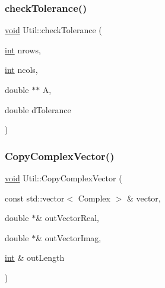 \mbox{\label{class_l_i_b___l_a_1_1_util_ab4e056ccf98d6691ccbb9fab23f0aa04}} 
\subsubsection{\texorpdfstring{check\+Tolerance()}{checkTolerance()}\hspace{0.1cm}{\footnotesize\ttfamily [2/2]}}
{\footnotesize\ttfamily \hyperlink{lp__lib_8h_ac7828c7b2b31d2e11af17bdb6289c5d9}{void} Util\+::check\+Tolerance (\begin{DoxyParamCaption}\item[{\hyperlink{lp__lib_8h_adeb9ec6400320e4923ac9d836d509ddb}{int}}]{nrows,  }\item[{\hyperlink{lp__lib_8h_adeb9ec6400320e4923ac9d836d509ddb}{int}}]{ncols,  }\item[{double $\ast$$\ast$}]{A,  }\item[{double}]{d\+Tolerance }\end{DoxyParamCaption})\hspace{0.3cm}{\ttfamily [static]}}

\mbox{\label{class_l_i_b___l_a_1_1_util_aebeb82835b470da692ab8622135cc0a2}} 
\subsubsection{\texorpdfstring{Copy\+Complex\+Vector()}{CopyComplexVector()}}
{\footnotesize\ttfamily \hyperlink{lp__lib_8h_ac7828c7b2b31d2e11af17bdb6289c5d9}{void} Util\+::\+Copy\+Complex\+Vector (\begin{DoxyParamCaption}\item[{const std\+::vector$<$ Complex $>$ \&}]{vector,  }\item[{double $\ast$\&}]{out\+Vector\+Real,  }\item[{double $\ast$\&}]{out\+Vector\+Imag,  }\item[{\hyperlink{lp__lib_8h_adeb9ec6400320e4923ac9d836d509ddb}{int} \&}]{out\+Length }\end{DoxyParamCaption})\hspace{0.3cm}{\ttfamily [static]}}

